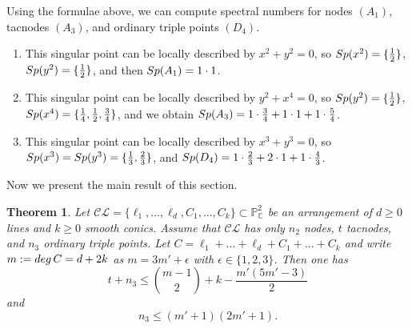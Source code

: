 \documentclass[12pt]{amsart}
\theoremstyle{plain}
\newtheorem{thm}[subsection]{Theorem}
\theoremstyle{definition}
\numberwithin{equation}{section}
\begin{document}
Using the formulae above, we can compute spectral numbers for nodes $(A_{1})$, tacnodes $(A_{3})$, and ordinary triple points $(D_{4})$.
\begin{enumerate}
\item[$(A_{1})$:] This singular point can be locally described by $x^{2} + y^{2} = 0$, so ${\rm Sp}(x^{2}) = \{\frac{1}{2}\}$, ${\rm Sp}(y^{2}) = \{\frac{1}{2}\}$, and then ${\rm Sp}(A_{1}) = 1\cdot 1$.
\item[$(A_{3})$:] This singular point can be locally described by $y^{2} + x^{4} = 0$, so ${\rm Sp}(y^{2}) = \{\frac{1}{2}\}$, ${\rm Sp}(x^{4}) = \{\frac{1}{4}, \frac{1}{2}, \frac{3}{4}\}$, and we obtain ${\rm Sp}(A_{3}) = 1 \cdot \frac{3}{4} + 1 \cdot 1 + 1 \cdot \frac{5}{4}$.
\item[$(D_{4})$:] This singular point can be locally described by $x^{3} + y^{3} = 0$, so ${\rm Sp}(x^{3}) = {\rm Sp}(y^{3}) = \{\frac{1}{3}, \frac{2}{3}\}$, and ${\rm Sp}(D_{4}) = 1\cdot \frac{2}{3} + 2 \cdot 1 + 1 \cdot \frac{4}{3}$. 
\end{enumerate}
Now we present the main result of this section.
\begin{thm}
\label{prop2}
Let $\mathcal{CL} = \{\ell_{1}, ..., \ell_{d}, C_{1}, ..., C_{k}\} \subset \mathbb{P}^{2}_{\mathbb{C}}$ be an arrangement of $d\geq 0$ lines and $k\geq 0$ smooth conics. Assume that $\mathcal{CL}$ has only $n_2$ nodes, $t$ tacnodes, and $n_3$ ordinary triple points. Let $C = \ell_{1} +...+\ell_{d}+C_{1} + ... + C_{k}$ and write  $m: = {\rm deg} \, C = d+2k$ as $m =3m' +\epsilon$ with $\epsilon \in \{1,2,3\}$.
Then one has
$$t + n_3\leq \binom{m-1}{2} +k  - \frac{m'(5m'-3)}{2}$$
and
$$n_3 \leq (m'+1)(2m'+1).$$
\end{thm}
\end{document}
